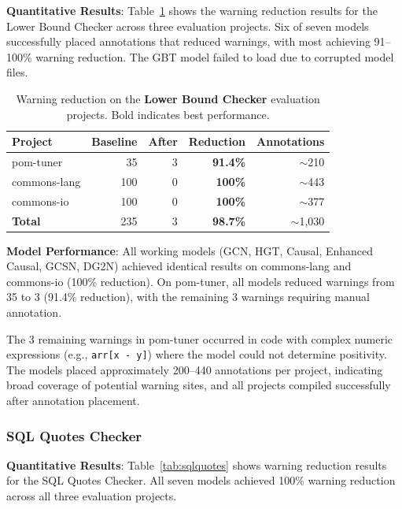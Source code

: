 \documentclass[acmsmall,screen,review,anonymous]{acmart}
\begin{document}
\textbf{Quantitative Results}: Table~\ref{tab:lowerbound} shows the warning reduction results for the Lower Bound Checker across three evaluation projects. Six of seven models successfully placed annotations that reduced warnings, with most achieving 91--100\% warning reduction. The GBT model failed to load due to corrupted model files.

\begin{table}[t]
\caption{Warning reduction on the \textbf{Lower Bound Checker} evaluation projects. Bold indicates best performance.}
\label{tab:lowerbound}
\begin{tabular}{lrrrr}
\toprule
\textbf{Project} & \textbf{Baseline} & \textbf{After} & \textbf{Reduction} & \textbf{Annotations} \\
\midrule
pom-tuner & 35 & 3 & \textbf{91.4\%} & $\sim$210 \\
commons-lang & 100 & 0 & \textbf{100\%} & $\sim$443 \\
commons-io & 100 & 0 & \textbf{100\%} & $\sim$377 \\
\midrule
\textbf{Total} & 235 & 3 & \textbf{98.7\%} & $\sim$1,030 \\
\bottomrule
\end{tabular}
\end{table}

\textbf{Model Performance}: All working models (GCN, HGT, Causal, Enhanced Causal, GCSN, DG2N) achieved identical results on commons-lang and commons-io (100\% reduction). On pom-tuner, all models reduced warnings from 35 to 3 (91.4\% reduction), with the remaining 3 warnings requiring manual annotation.

The 3 remaining warnings in pom-tuner occurred in code with complex numeric expressions (e.g., \texttt{arr[x - y]}) where the model could not determine positivity. The models placed approximately 200--440 annotations per project, indicating broad coverage of potential warning sites, and all projects compiled successfully after annotation placement.

\subsubsection{SQL Quotes Checker}
\label{sec:sqlresults}

\textbf{Quantitative Results}: Table~\ref{tab:sqlquotes} shows warning reduction results for the SQL Quotes Checker. All seven models achieved 100\% warning reduction across all three evaluation projects.
\end{document}
